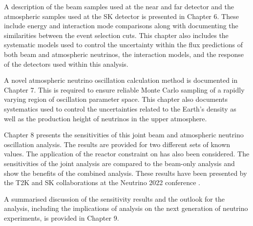 A description of the beam samples used at the near and far detector and the atmospheric samples used at the SK detector is presented in Chapter 6. These include energy and interaction mode comparisons along with documenting the similarities between the event selection cuts. This chapter also includes the systematic models used to control the uncertainty within the flux predictions of both beam and atmospheric neutrinos, the interaction models, and the response of the detectors used within this analysis.

A novel atmospheric neutrino oscillation calculation method is documented in Chapter 7. This is required to ensure reliable Monte Carlo sampling of a rapidly varying region of oscillation parameter space. This chapter also documents systematics used to control the uncertainties related to the Earth's density as well as the production height of neutrinos in the upper atmosphere.

Chapter 8 presents the sensitivities of this joint beam and atmospheric neutrino oscillation analysis.
The results are provided for two different sets of known values. The application of the reactor constraint on  has also been considered. The sensitivities of the joint analysis are compared to the beam-only analysis and show the benefits of the combined analysis. These results have been presented by the T2K and SK collaborations at the Neutrino 2022 conference \cite{Bronner2022-wd}.

A summarised discussion of the sensitivity results and the outlook for the analysis, including the implications of analysis on the next generation of neutrino experiments, is provided in Chapter 9.
